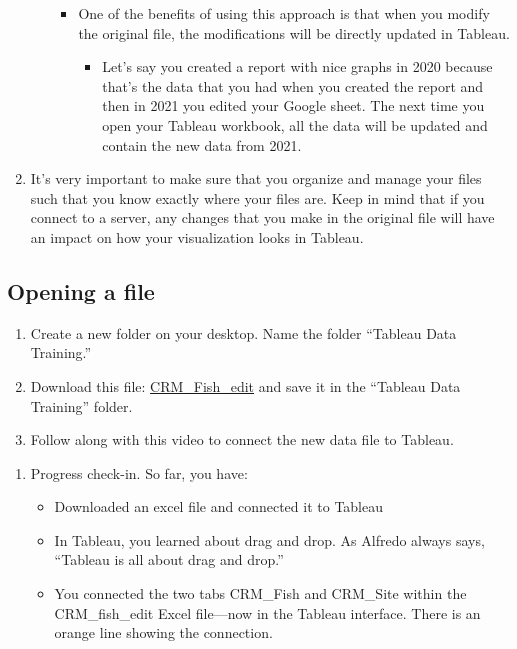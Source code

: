 \documentclass[
]{book}
\providecommand{\tightlist}{%
  \setlength{\itemsep}{0pt}\setlength{\parskip}{0pt}}
\begin{document}
\begin{enumerate}
\begin{itemize}
    \begin{itemize}
    \tightlist
    \item
      One of the benefits of using this approach is that when you modify the original file, the modifications will be directly updated in Tableau.

      \begin{itemize}
      \tightlist
      \item
        Let's say you created a report with nice graphs in 2020 because that's the data that you had when you created the report and then in 2021 you edited your Google sheet. The next time you open your Tableau workbook, all the data will be updated and contain the new data from 2021.
      \end{itemize}
    \end{itemize}
  \end{itemize}
\item
  It's very important to make sure that you organize and manage your files such that you know exactly where your files are. Keep in mind that if you connect to a server, any changes that you make in the original file will have an impact on how your visualization looks in Tableau.
\end{enumerate}

\hypertarget{opening-a-file}{%
\subsection{Opening a file}\label{opening-a-file}}

\begin{enumerate}
\def\labelenumi{\arabic{enumi}.}
\item
  Create a new folder on your desktop. Name the folder ``Tableau Data Training.''
\item
  Download this file: \href{files/CRM_Fish_edit.xlsx}{CRM\_Fish\_edit} and save it in the ``Tableau Data Training'' folder.
\item
  Follow along with this video to connect the new data file to Tableau.
\end{enumerate}

\begin{enumerate}
\def\labelenumi{\arabic{enumi}.}
\setcounter{enumi}{3}
\tightlist
\item
  Progress check-in. So far, you have:

  \begin{itemize}
  \tightlist
  \item
    Downloaded an excel file and connected it to Tableau
  \item
    In Tableau, you learned about drag and drop. As Alfredo always says, ``Tableau is all about drag and drop.''
  \item
    You connected the two tabs CRM\_Fish and CRM\_Site within the CRM\_fish\_edit Excel file---now in the Tableau interface. There is an orange line showing the connection.
  \end{itemize}
\end{enumerate}
\end{document}
